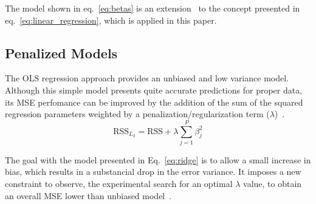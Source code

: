 The model shown in eq.~\ref{eq:betas} is an extension~\cite{Kuhn2013} to the concept presented in eq.~\ref{eq:linear_regression}, which is applied in this paper.



\subsection{Penalized Models}
The OLS regression approach provides an unbiased and low variance model. Although this simple model presents quite accurate predictions for proper data, its MSE perfomance can be improved by the addition of the sum of the squared regression parameters weighted by a penalization/regularization term ($\lambda$)~\cite{Kuhn2013}.
\begin{equation}
  \text{RSS}_{L_2} = \text{RSS} + \lambda \sum_{j = 1}^{P} \beta_{j}^2
  \label{eq:ridge}
\end{equation}

The goal with the model presented in Eq.~\ref{eq:ridge} is to allow a small increase in bias, which results in a substancial drop in the error variance. It imposes a new constraint to observe, the experimental search for an optimal $\lambda$ value, to obtain an overall MSE lower than unbiased model~\cite{James2013, Kuhn2013}.

